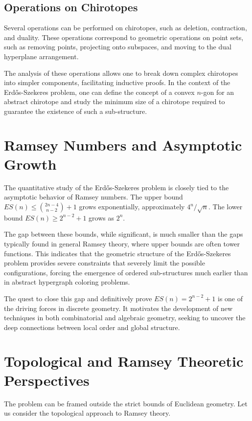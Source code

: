 \documentclass[11pt,a4paper]{article}
\begin{document}
\subsection{Operations on Chirotopes}
Several operations can be performed on chirotopes, such as deletion, contraction, and duality. These operations correspond to geometric operations on point sets, such as removing points, projecting onto subspaces, and moving to the dual hyperplane arrangement.

The analysis of these operations allows one to break down complex chirotopes into simpler components, facilitating inductive proofs. In the context of the Erd\H{o}s-Szekeres problem, one can define the concept of a convex $n$-gon for an abstract chirotope and study the minimum size of a chirotope required to guarantee the existence of such a sub-structure.

\section{Ramsey Numbers and Asymptotic Growth}
The quantitative study of the Erd\H{o}s-Szekeres problem is closely tied to the asymptotic behavior of Ramsey numbers. The upper bound $ES(n) \le \binom{2n-4}{n-2} + 1$ grows exponentially, approximately $4^n / \sqrt{n}$. The lower bound $ES(n) \ge 2^{n-2} + 1$ grows as $2^n$.

The gap between these bounds, while significant, is much smaller than the gaps typically found in general Ramsey theory, where upper bounds are often tower functions. This indicates that the geometric structure of the Erd\H{o}s-Szekeres problem provides severe constraints that severely limit the possible configurations, forcing the emergence of ordered sub-structures much earlier than in abstract hypergraph coloring problems.

The quest to close this gap and definitively prove $ES(n) = 2^{n-2} + 1$ is one of the driving forces in discrete geometry. It motivates the development of new techniques in both combinatorial and algebraic geometry, seeking to uncover the deep connections between local order and global structure.

\section{Topological and Ramsey Theoretic Perspectives}

The problem can be framed outside the strict bounds of Euclidean geometry. Let us consider the topological approach to Ramsey theory.
\end{document}
